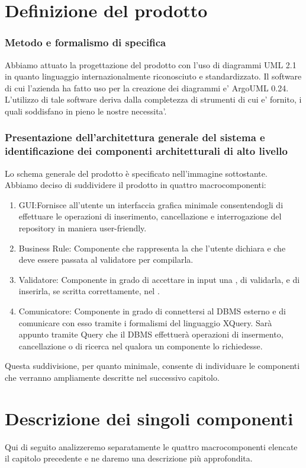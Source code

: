 \documentclass[11pt,titlepage,a4paper]{report}
\begin{document}
\chapter{Definizione del prodotto}
\subsection{Metodo e formalismo di specifica}
Abbiamo attuato la progettazione del prodotto con l'uso di diagrammi UML 2.1 in quanto linguaggio internazionalmente riconosciuto e standardizzato.
Il software di cui l’azienda ha fatto uso per la creazione dei diagrammi e' ArgoUML 0.24. L'utilizzo di tale software deriva dalla completezza
di strumenti di cui e' fornito, i quali soddisfano in pieno le nostre necessita'.

\subsection{Presentazione dell'architettura generale del sistema e identificazione dei componenti architetturali di alto livello}
Lo schema generale del prodotto è specificato nell'immagine sottostante.
Abbiamo deciso di suddividere il prodotto in quattro macrocomponenti:
\begin{enumerate}perper
 \item GUI:Fornisce all'utente un interfaccia grafica minimale consentendogli di effettuare le operazioni di inserimento, cancellazione e interrogazione del repository in maniera user-friendly.
\item Business Rule: Componente che rappresenta la \br che l'utente dichiara e che deve essere passata al validatore per compilarla.
\item Validatore: Componente in grado di accettare in input una \br, di validarla, e di inserirla, se scritta correttamente, nel \re.
\item Comunicatore: Componente in grado di connettersi al DBMS esterno e di comunicare con esso tramite i formalismi del linguaggio XQuery.
Sar\`a appunto tramite Query che il DBMS effettuer\`a operazioni di insermento, cancellazione o di ricerca nel \re qualora un componente lo richiedesse.
\end{enumerate}
Questa suddivisione, per quanto minimale, consente di individuare le componenti che verranno ampliamente descritte nel successivo capitolo.

\chapter{Descrizione dei singoli componenti}
Qui di seguito analizzeremo separatamente le quattro macrocomponenti elencate il capitolo precedente e ne daremo una descrizione pi\`u approfondita.
\end{document}
